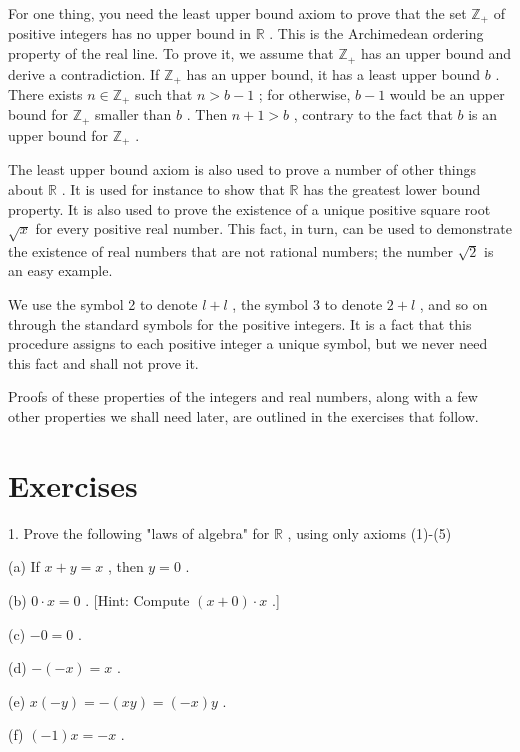 For one thing, you need the least upper bound axiom to prove that the set \({\mathbb{Z}}_{ + }\) of positive integers has no upper bound in \(\mathbb{R}\) . This is the Archimedean ordering property of the real line. To prove it, we assume that \({\mathbb{Z}}_{ + }\) has an upper bound and derive a contradiction. If \({\mathbb{Z}}_{ + }\) has an upper bound, it has a least upper bound \(b\) . There exists \(n \in  {\mathbb{Z}}_{ + }\) such that \(n > b - 1\) ; for otherwise, \(b - 1\) would be an upper bound for \({\mathbb{Z}}_{ + }\) smaller than \(b\) . Then \(n + 1 > b\) , contrary to the fact that \(b\) is an upper bound for \({\mathbb{Z}}_{ + }\) .

The least upper bound axiom is also used to prove a number of other things about \(\mathbb{R}\) . It is used for instance to show that \(\mathbb{R}\) has the greatest lower bound property. It is also used to prove the existence of a unique positive square root \(\sqrt{x}\) for every positive real number. This fact, in turn, can be used to demonstrate the existence of real numbers that are not rational numbers; the number \(\sqrt{2}\) is an easy example.

We use the symbol 2 to denote \(l + l\) , the symbol 3 to denote \(2 + l\) , and so on through the standard symbols for the positive integers. It is a fact that this procedure assigns to each positive integer a unique symbol, but we never need this fact and shall not prove it.

Proofs of these properties of the integers and real numbers, along with a few other properties we shall need later, are outlined in the exercises that follow.

\section*{Exercises}


1. Prove the following "laws of algebra" for \(\mathbb{R}\) , using only axioms (1)-(5)

(a) If \(x + y = x\) , then \(y = 0\) .

(b) \(0 \cdot  x = 0\) . [Hint: Compute \(\left( {x + 0}\right)  \cdot  x\) .]

(c) \(- 0 = 0\) .

(d) \(- \left( {-x}\right)  = x\) .

(e) \(x\left( {-y}\right)  =  - \left( {xy}\right)  = \left( {-x}\right) y\) .

(f) \(\left( {-1}\right) x =  - x\) .

